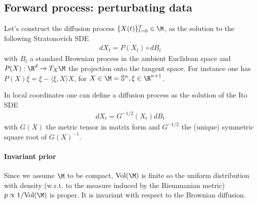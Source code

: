 \subsection{Forward process: perturbating data}

Let's construct the diffusion process $\{X(t)\}_{t=0}^T  \in \M$, as the solution to the following Stratonovich SDE %
\begin{align}
dX_t = P(X_t) \circ dB_t
\end{align}
with $B_t$ a standard Brownian process in the ambient Euclidean space and $P(X):\R^d \rightarrow T_{X}\M$ the projection onto the tangent space. For instance one has $P(X) \xi = \xi - \langle \xi, X \rangle X$, for $X \in \M = \mathbb{S}^n, \xi \in \R^{n+1}$.
%

In local coordinates one can define a diffusion process as the solution of the Ito SDE
\begin{align}
dX_t =  G^{-1/2}(X_t) dB_t
\end{align}
with $G(X)$ the metric tensor in matrix form and $G^{-1/2}$ the (unique) symmetric square root of $G(X)^{-1}$.
%

\paragraph{Invariant prior}
Since we assume $\M$ to be compact, $\text{Vol}(\M)$ is finite so the uniform distribution with density (w.r.t. to the measure induced by the Riemmanian metric) $p \propto 1/\text{Vol}(\M)$ is proper.
It is invariant with respect to the Brownian diffusion.

